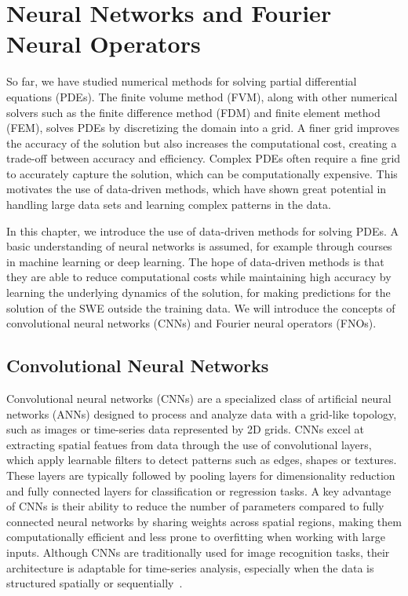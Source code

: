 \chapter{Neural Networks and Fourier Neural Operators}\label{ch:FNO+NN}
So far, we have studied numerical methods for solving partial differential equations (PDEs).
The finite volume method (FVM), along with other numerical solvers such as the finite difference method (FDM) and finite element method (FEM), solves PDEs by discretizing the domain into a grid.
A finer grid improves the accuracy of the solution but also increases the computational cost, creating a trade-off between accuracy and efficiency.
Complex PDEs often require a fine grid to accurately capture the solution, which can be computationally expensive.
This motivates the use of data-driven methods, which have shown great potential in handling large data sets and learning complex patterns in the data.

In this chapter, we introduce the use of data-driven methods for solving PDEs.
A basic understanding of neural networks is assumed, for example through courses in machine learning or deep learning.
The hope of data-driven methods is that they are able to reduce computational costs while maintaining high accuracy by learning the underlying dynamics of the solution, for making predictions for the solution of the SWE outside the training data.
We will introduce the concepts of convolutional neural networks (CNNs) and Fourier neural operators (FNOs).

\section{Convolutional Neural Networks}
Convolutional neural networks (CNNs) are a specialized class of artificial neural networks (ANNs) designed to process and analyze data with a grid-like topology, such as images or time-series data represented by 2D grids.
CNNs excel at extracting spatial featues from data through the use of convolutional layers, which apply learnable filters to detect patterns such as edges, shapes or textures.
These layers are typically followed by pooling layers for dimensionality reduction and fully connected layers for classification or regression tasks.
A key advantage of CNNs is their ability to reduce the number of parameters compared to fully connected neural networks by sharing weights across spatial regions, making them computationally efficient and less prone to overfitting when working with large inputs.
Although CNNs are traditionally used for image recognition tasks, their architecture is adaptable for time-series analysis, especially when the data is structured spatially or sequentially~\cite{chollet2017comprehensive}.

